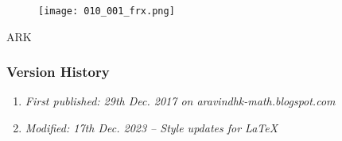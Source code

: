 \begin{figure}[H]
	\centering
	\texttt{[image: 010\_001\_frx.png]}
\end{figure}

ARK

\subsubsection{Version History}
\begin{enumerate}
	\item \emph{First published: 29th Dec. 2017 on aravindhk-math.blogspot.com}
	\item \emph{Modified: 17th Dec. 2023 -- Style updates for \LaTeX}
\end{enumerate}
